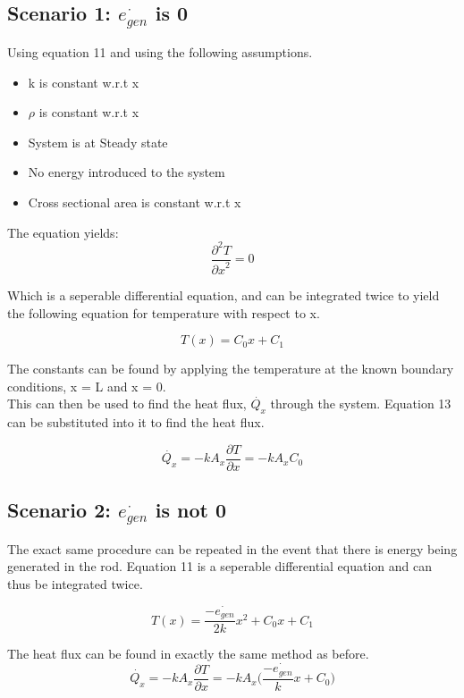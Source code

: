 \documentclass[•]{article}
\begin{document}
\subsection*{Scenario 1: $\dot{e_{gen}}$ is 0}
Using equation 11 and using the following assumptions.
\begin{itemize}
\item k is constant w.r.t x
\item $\rho$ is constant w.r.t x
\item System is at Steady state
\item No energy introduced to the system
\item Cross sectional area is constant w.r.t x
\end{itemize}

The equation yields:
\begin{equation}
\frac{\partial^2 T}{{\partial x}^2} = 0
\end{equation}

Which is a seperable differential equation, and can be integrated twice to yield the following equation for temperature with respect to x.

\begin{equation}
T(x) = C_0x + C_1
\end{equation}

The constants can be found by applying the temperature at the known boundary conditions, x = L and x = 0.\\

This can then be used to find the heat flux, $\dot{Q_x}$ through the system. Equation 13 can be substituted into it to find the heat flux.

\begin{equation}
\dot{Q_x} = -kA_x\frac{\partial T}{\partial x} = -kA_xC_0
\end{equation}

\subsection*{Scenario 2: $\dot{e_{gen}}$ is not 0}
The exact same procedure can be repeated in the event that there is energy being generated in the rod. Equation 11 is a seperable differential equation and can thus be integrated twice.

\begin{equation}
T(x) = \frac{-\dot{e_{gen}}}{2k}x^2 + C_0x + C_1
\end{equation}

The heat flux can be found in exactly the same method as before.
\begin{equation}
\dot{Q_x} = -kA_x\frac{\partial T}{\partial x} = -kA_x{\Big(\frac{-\dot{e_{gen}}}{k}x+C_0\Big)}
\end{equation}
\end{document}
